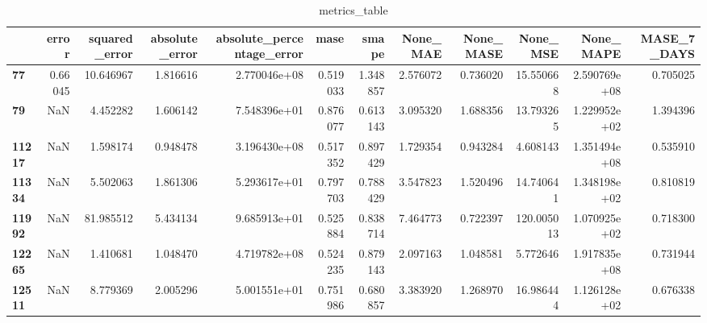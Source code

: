 \begin{table}[h]
\centering
\caption{metrics_table}
\label{table:PRedict high-variance dataset with lstm}
\begin{tabular}{lrrrrrrrrrrr}
\toprule
{} &    error &  squared\_error &  absolute\_error &  absolute\_percentage\_error &      mase &     smape &  None\_MAE &  None\_MASE &    None\_MSE &     None\_MAPE &  MASE\_7\_DAYS \\
\midrule
\textbf{77   } &  0.66045 &      10.646967 &        1.816616 &               2.770046e+08 &  0.519033 &  1.348857 &  2.576072 &   0.736020 &   15.550668 &  2.590769e+08 &     0.705025 \\
\textbf{79   } &      NaN &       4.452282 &        1.606142 &               7.548396e+01 &  0.876077 &  0.613143 &  3.095320 &   1.688356 &   13.793265 &  1.229952e+02 &     1.394396 \\
\textbf{11217} &      NaN &       1.598174 &        0.948478 &               3.196430e+08 &  0.517352 &  0.897429 &  1.729354 &   0.943284 &    4.608143 &  1.351494e+08 &     0.535910 \\
\textbf{11334} &      NaN &       5.502063 &        1.861306 &               5.293617e+01 &  0.797703 &  0.788429 &  3.547823 &   1.520496 &   14.740641 &  1.348198e+02 &     0.810819 \\
\textbf{11992} &      NaN &      81.985512 &        5.434134 &               9.685913e+01 &  0.525884 &  0.838714 &  7.464773 &   0.722397 &  120.005013 &  1.070925e+02 &     0.718300 \\
\textbf{12265} &      NaN &       1.410681 &        1.048470 &               4.719782e+08 &  0.524235 &  0.879143 &  2.097163 &   1.048581 &    5.772646 &  1.917835e+08 &     0.731944 \\
\textbf{12511} &      NaN &       8.779369 &        2.005296 &               5.001551e+01 &  0.751986 &  0.680857 &  3.383920 &   1.268970 &   16.986444 &  1.126128e+02 &     0.676338 \\
\bottomrule
\end{tabular}
\end{table}
